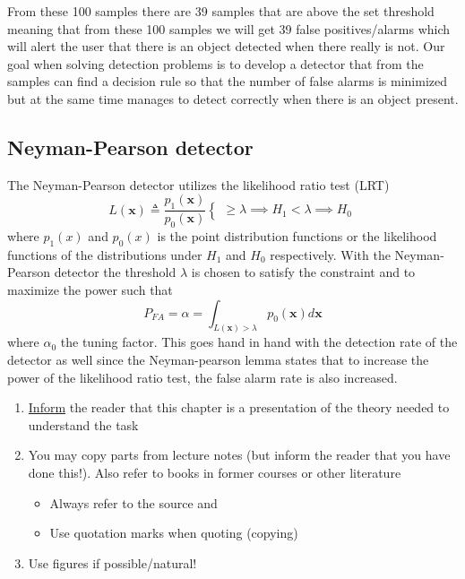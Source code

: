 From these 100 samples there are 39 samples that are above the set threshold meaning that from these 100 samples we will get 39 false positives/alarms which will alert the user that there is an object detected when there really is not. Our goal when solving detection problems is to develop a detector that from the samples can find a decision rule so that the number of false alarms is minimized but at the same time manages to detect correctly when there is an object present.\cite{Myrvoll2020}\\
\subsection{Neyman-Pearson detector}
The Neyman-Pearson detector utilizes the likelihood ratio test (LRT)
\begin{equation}
	L(\mathbf{x}) \triangleq \frac{p_1(\mathbf{x})}{p_0(\mathbf{x})} 
		\begin{cases}
			\geq \lambda \implies H_1
			< \lambda \implies H_0
		\end{cases} 
\end{equation}
where $p_1(x)$ and $p_0(x)$ is the point distribution functions or the likelihood functions of the distributions under $H_1$ and $H_0$ respectively.
With the Neyman-Pearson detector the threshold $\lambda$ is chosen to satisfy the constraint and to maximize the power such that
\begin{equation}
	P_{FA} = \alpha = \int_{L(\mathbf{x})>\lambda}p_0(\mathbf{x})d\mathbf{x}
\end{equation}
where $\alpha_0$ the tuning factor. This goes hand in hand with the detection rate of the detector as well since the Neyman-pearson lemma states that to increase the power of the likelihood ratio test, the false alarm rate is also increased. 
\begin{enumerate}[i]
	\item \underline{Inform} the reader that this chapter is a presentation of the theory needed to understand the task
	\item You may copy parts from lecture notes (but inform
	the reader that you have done this!). Also refer to
	books in former courses or other literature
	\begin{itemize}
		\item Always refer to the source and
		\item Use quotation marks when quoting (copying) 
	\end{itemize}
	\item Use figures if possible/natural!
\end{enumerate}
